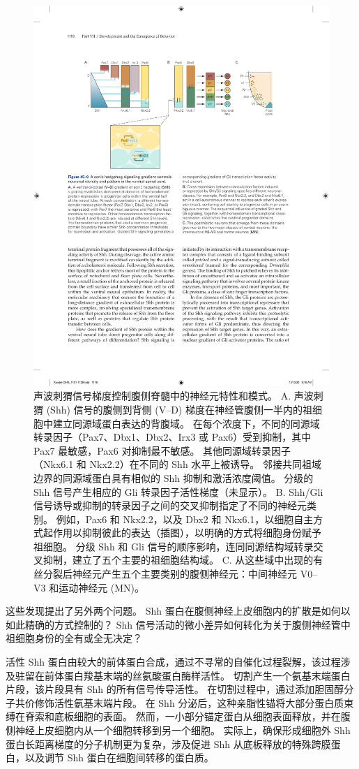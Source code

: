\begin{figure}[htbp]
	\centering
	\includegraphics[width=0.8\linewidth]{chap45/fig_45_9}
	\caption{声波刺猬信号梯度控制腹侧脊髓中的神经元特性和模式。 A. 声波刺猬 (Shh) 信号的腹侧到背侧 (V–D) 梯度在神经管腹侧一半内的祖细胞中建立同源域蛋白表达的背腹域。 在每个浓度下，不同的同源域转录因子（Pax7、Dbx1、Dbx2、Irx3 或 Pax6）受到抑制，其中 Pax7 最敏感，Pax6 对抑制最不敏感。 其他同源域转录因子（Nkx6.1 和 Nkx2.2）在不同的 Shh 水平上被诱导。 邻接共同祖域边界的同源域蛋白具有相似的 Shh 抑制和激活浓度阈值。 分级的 Shh 信号产生相应的 Gli 转录因子活性梯度（未显示）。 B. Shh/Gli 信号诱导或抑制的转录因子之间的交叉抑制指定了不同的神经元类别。 例如，Pax6 和 Nkx2.2，以及 Dbx2 和 Nkx6.1，以细胞自主方式起作用以抑制彼此的表达（插图），以明确的方式将细胞身份赋予祖细胞。 分级 Shh 和 Gli 信号的顺序影响，连同同源结构域转录交叉抑制，建立了五个主要的祖细胞结构域。 C. 从这些域中出现的有丝分裂后神经元产生五个主要类别的腹侧神经元：中间神经元 V0–V3 和运动神经元 (MN)。}
	\label{fig:45_9}
\end{figure}

这些发现提出了另外两个问题。 Shh 蛋白在腹侧神经上皮细胞内的扩散是如何以如此精确的方式控制的？ Shh 信号活动的微小差异如何转化为关于腹侧神经管中祖细胞身份的全有或全无决定？

活性 Shh 蛋白由较大的前体蛋白合成，通过不寻常的自催化过程裂解，该过程涉及驻留在前体蛋白羧基末端的丝氨酸蛋白酶样活性。 切割产生一个氨基末端蛋白片段，该片段具有 Shh 的所有信号传导活性。 在切割过程中，通过添加胆固醇分子共价修饰活性氨基末端片段。 在 Shh 分泌后，这种亲脂性锚将大部分蛋白质束缚在脊索和底板细胞的表面。 然而，一小部分锚定蛋白从细胞表面释放，并在腹侧神经上皮细胞内从一个细胞转移到另一个细胞。 实际上，确保形成细胞外 Shh 蛋白长距离梯度的分子机制更为复杂，涉及促进 Shh 从底板释放的特殊跨膜蛋白，以及调节 Shh 蛋白在细胞间转移的蛋白质。

